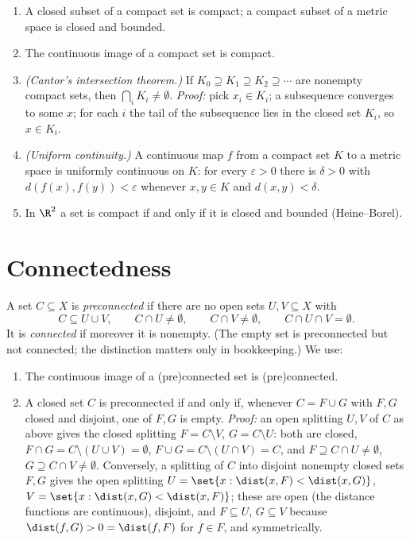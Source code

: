 \begin{enumerate}[label=(C\arabic*)]
\item A closed subset of a compact set is compact; a compact subset of a metric space is
closed and bounded.
\item The continuous image of a compact set is compact.
\item\label{C:cantor} \emph{(Cantor's intersection theorem.)} If $K_0\supseteq K_1\supseteq
K_2\supseteq\cdots$ are nonempty compact sets, then $\bigcap_i K_i\neq\emptyset$.
\emph{Proof:} pick $x_i\in K_i$; a subsequence converges to some $x$; for each $i$ the tail
of the subsequence lies in the closed set $K_i$, so $x\in K_i$.
\item\label{C:unif} \emph{(Uniform continuity.)} A continuous map $f$ from a compact set $K$
to a metric space is uniformly continuous on $K$: for every $\varepsilon>0$ there is
$\delta>0$ with $d(f(x),f(y))<\varepsilon$ whenever $x,y\in K$ and $d(x,y)<\delta$.
\item In $\R^2$ a set is compact if and only if it is closed and bounded (Heine--Borel).
\end{enumerate}

\section{Connectedness}

A set $C\subseteq X$ is \emph{preconnected} if there are no open sets $U,V\subseteq X$ with
\[
C\subseteq U\cup V,\qquad C\cap U\neq\emptyset,\qquad C\cap V\neq\emptyset,\qquad
C\cap U\cap V=\emptyset .
\]
It is \emph{connected} if moreover it is nonempty. (The empty set is preconnected but not
connected; the distinction matters only in bookkeeping.) We use:

\begin{enumerate}[label=(K\arabic*)]
\item The continuous image of a (pre)connected set is (pre)connected.
\item\label{K:closed} A closed set $C$ is preconnected if and only if, whenever
$C=F\cup G$ with $F,G$ closed and disjoint, one of $F,G$ is empty. \emph{Proof:} an open
splitting $U,V$ of $C$ as above gives the closed splitting $F=C\setminus V$, $G=C\setminus U$:
both are closed, $F\cap G=C\setminus(U\cup V)=\emptyset$, $F\cup G=C\setminus(U\cap V)=C$, and
$F\supseteq C\cap U\neq\emptyset$, $G\supseteq C\cap V\neq\emptyset$. Conversely, a splitting of
$C$ into disjoint nonempty closed sets $F,G$ gives the open splitting
$U=\set{x:\dist(x,F)<\dist(x,G)}$, $V=\set{x:\dist(x,G)<\dist(x,F)}$; these are open (the
distance functions are continuous), disjoint, and $F\subseteq U$, $G\subseteq V$ because
$\dist(f,G)>0=\dist(f,F)$ for $f\in F$, and symmetrically.
\end{enumerate}


